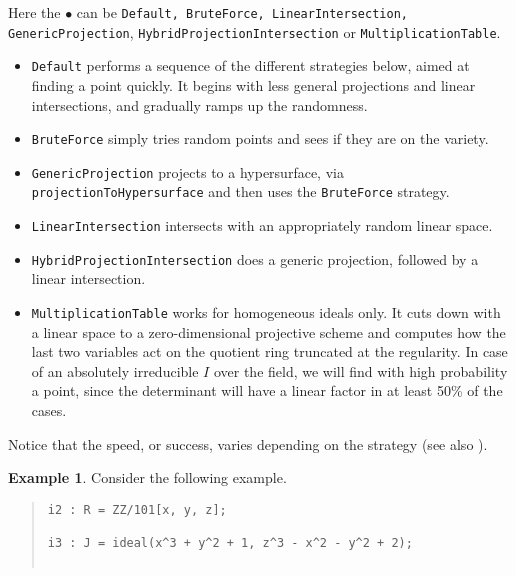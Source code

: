 \documentclass[11pt]{amsart}
\theoremstyle{definition}
\newtheorem{example}{Example}[section]
\begin{document}
    \begin{description}%
        \setlength{\itemsep}{5pt}
    \item[\tt Strategy => $\bullet$]   Here the $\bullet$ can be {\tt Default, BruteForce, LinearIntersection, \\ GenericProjection}, {\tt HybridProjectionIntersection} or {\tt MultiplicationTable}.

    \begin{itemize}
    \item {\tt Default} performs a sequence of the different strategies below, aimed at finding a point quickly.  It begins with less general projections and linear intersections, and gradually ramps up the randomness.  
    \item {\tt BruteForce} simply tries random points and sees if they are on the variety.
        
    \item {\tt GenericProjection} projects to a hypersurface, via 
        {\tt projectionToHypersurface} and then uses the {\tt BruteForce} strategy.
        
    \item {\tt LinearIntersection} intersects with an appropriately random linear space.
        
    \item {\tt HybridProjectionIntersection} does a generic projection, followed by a linear intersection. 		
    
    \item {\tt MultiplicationTable} works for homogeneous ideals only. It cuts down with a linear space to a zero-dimensional projective scheme and computes how the last two variables act on the quotient ring truncated  
    at the regularity. In case of an absolutely irreducible $I$ over the field, we will find with  high probability a point, 
    since the determinant will have a linear factor in at least 50\% of the cases.
    \end{itemize}

    Notice that the speed, or success, varies depending on the strategy (see also ).

    \begin{example}\label{BruteForce}
        Consider the following example.
        ~~        
        {\small\color{blue}
    \begin{quote}
\begin{verbatim}
i2 : R = ZZ/101[x, y, z];

i3 : J = ideal(x^3 + y^2 + 1, z^3 - x^2 - y^2 + 2);


\end{verbatim}
\end{quote}}
\end{example}
\end{description}
\end{document}

